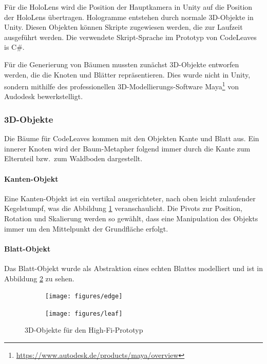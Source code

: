 Für die HoloLens wird die Position der Hauptkamera in Unity auf die Position der HoloLens übertragen. Hologramme entstehen durch normale 3D-Objekte in Unity. Diesen Objekten können Skripte zugewiesen werden, die zur Laufzeit ausgeführt werden. Die verwendete Skript-Sprache im Prototyp von CodeLeaves is C\#.

Für die Generierung von Bäumen mussten zunächst 3D-Objekte entworfen werden, die die Knoten und Blätter repräsentieren. Dies wurde nicht in Unity, sondern mithilfe des professionellen 3D-Modellierungs-Software Maya\footnote{\url{https://www.autodesk.de/products/maya/overview}} von Audodesk bewerkstelligt.

\subsubsection*{3D-Objekte}

Die Bäume für CodeLeaves kommen mit den Objekten Kante und Blatt aus. Ein innerer Knoten wird der Baum-Metapher folgend immer durch die Kante zum Elternteil bzw.\ zum Waldboden dargestellt.

\paragraph{Kanten-Objekt} Eine Kanten-Objekt ist ein vertikal ausgerichteter, nach oben leicht zulaufender Kegelstumpf, was die Abbildung \ref{fig:edge} veranschaulicht. Die Pivots zur Position, Rotation und Skalierung werden so gewählt, dass eine Manipulation des Objekts immer um den Mittelpunkt der Grundfläche erfolgt.\\

\paragraph{Blatt-Objekt} Das Blatt-Objekt wurde als Abstraktion eines echten Blattes modelliert und ist in Abbildung \ref{fig:leaf} zu sehen.\\

\setlength{\fwidth}{.3\textwidth}
\begin{figure}[htb]
  \centering
  \begin{subfigure}[b]{\fwidth}
   \texttt{[image: figures/edge]}
    \label{fig:edge}
  \end{subfigure}
  \hspace{.5 cm}
  \begin{subfigure}[b]{\fwidth}
  	\texttt{[image: figures/leaf]}
  	 \label{fig:leaf}
  \end{subfigure}
  \caption{3D-Objekte für den High-Fi-Prototyp} \label{fig:3d-objects}
\end{figure}


